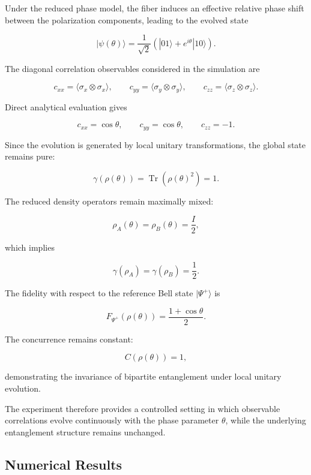 Under the reduced phase model, the fiber induces an effective relative phase shift between the polarization components, leading to the evolved state

\begin{equation}
|\psi(\theta)\rangle
=
\frac{1}{\sqrt{2}}
\left(
|01\rangle + e^{i\theta}|10\rangle
\right).
\label{eq:phase_evolved_bell_state}
\end{equation}

The diagonal correlation observables considered in the simulation are

\[
c_{xx}
=
\langle \sigma_x \otimes \sigma_x \rangle,
\qquad
c_{yy}
=
\langle \sigma_y \otimes \sigma_y \rangle,
\qquad
c_{zz}
=
\langle \sigma_z \otimes \sigma_z \rangle.
\]

Direct analytical evaluation gives

\[
c_{xx} = \cos\theta,
\qquad
c_{yy} = \cos\theta,
\qquad
c_{zz} = -1.
\]

Since the evolution is generated by local unitary transformations, the global state remains pure:

\[
\gamma(\rho(\theta))
=
\operatorname{Tr}
\left(
\rho(\theta)^2
\right)
=
1.
\]

The reduced density operators remain maximally mixed:

\[
\rho_A(\theta)
=
\rho_B(\theta)
=
\frac{I}{2},
\]

which implies

\[
\gamma(\rho_A)
=
\gamma(\rho_B)
=
\frac{1}{2}.
\]

The fidelity with respect to the reference Bell state \( |\Psi^+\rangle \) is

\[
F_{\Psi^+}(\rho(\theta))
=
\frac{1+\cos\theta}{2}.
\]

The concurrence remains constant:

\[
C(\rho(\theta))
=
1,
\]

demonstrating the invariance of bipartite entanglement under local unitary evolution.

\medskip

The experiment therefore provides a controlled setting in which observable correlations evolve continuously with the phase parameter \( \theta \), while the underlying entanglement structure remains unchanged.


\subsection*{Numerical Results}

